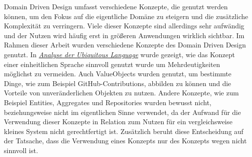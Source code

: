 Domain Driven Design umfasst verschiedene Konzepte, die genutzt werden können, um den Fokus auf die eigentliche Domäne zu steigern und die zusätzliche Komplexität zu verringern.
Viele dieser Konzepte sind allerdings sehr aufwändig und der Nutzen wird häufig erst in größeren Anwendungen wirklich sichtbar.
Im Rahmen dieser Arbeit wurden verschiedene Konzepte des Domain Driven Design genutzt.
In \hyperref[sec:ubiq_lang]{\textit{Analyse der Ubiquitous Language}} wurde gezeigt, wie das Konzept einer einheitlichen Sprache sinnvoll genutzt wurde um Mehrdeutigkeiten möglichst zu vermeiden.
Auch ValueObjects wurden genutzt, um bestimmte Dinge, wie zum Beispiel GitHub-Contributions, abbilden zu können und die Vorteile von unveränderlichen Objekten zu nutzen.
Andere Konzepte, wie zum Beispiel Entities, Aggregates und Repositories wurden bewusst nicht, beziehungsweise nicht im eigentlichen Sinne verwendet, da der Aufwand für die Verwendung dieser Konzepte in Relation zum Nutzen für ein vergleichsweise kleines System nicht gerechtfertigt ist.
Zusätzlich beruht diese Entscheidung auf der Tatsache, dass die Verwendung eines Konzepts nur des Konzepts wegen nicht sinnvoll ist.